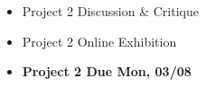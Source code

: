 \def\dMon{Mon, 03/08}
\def\dTues{Tues, 03/09}
\def\dWed{Wed, 03/10}
\def\dThur{Thur, 03/11}
\def\dFri{Fri, 03/12}
\def\dSat{Sat, 03/13}
\def\dSun{Sun, 03/14}
\placeDate





% 
\begin{itemize}[noitemsep,topsep=0pt,leftmargin=*]
    \item Project 2 Discussion \& Critique
    \item Project 2 Online Exhibition
\end{itemize}
\begin{itemize}[noitemsep,topsep=0pt,leftmargin=*]
    \item \textcolor{defaultColor}{\textbf{Project 2 Due \dMon}}
\end{itemize}
